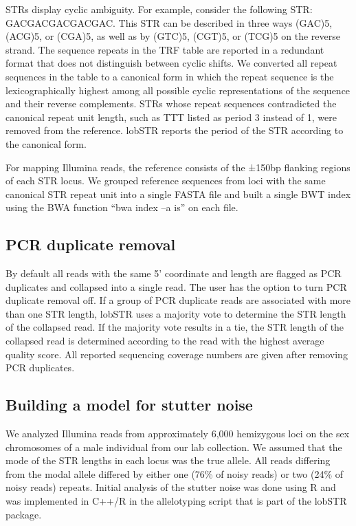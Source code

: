 STRs display cyclic ambiguity. For example, consider the following STR: GACGACGACGACGAC. This STR can be described in three ways (GAC)5, (ACG)5, or (CGA)5, as well as by (GTC)5, (CGT)5, or (TCG)5 on the reverse strand. The sequence repeats in the TRF table are reported in a redundant format that does not distinguish between cyclic shifts. We converted all repeat sequences in the table to a canonical form in which the repeat sequence is the lexicographically highest among all possible cyclic representations of the sequence and their reverse complements. STRs whose repeat sequences contradicted the canonical repeat unit length, such as TTT listed as period 3 instead of 1, were removed from the reference. lobSTR reports the period of the STR according to the canonical form.

For mapping Illumina reads, the reference consists of the ±150bp flanking regions of each STR locus. We grouped reference sequences from loci with the same canonical STR repeat unit into a single FASTA file and built a single BWT index using the BWA function ``bwa index –a is'' on each file.

\subsection{PCR duplicate removal}
By default all reads with the same 5' coordinate and length are flagged as PCR duplicates and collapsed into a single read. The user has the option to turn PCR duplicate removal off. If a group of PCR duplicate reads are associated with more than one STR length, lobSTR uses a majority vote to determine the STR length of the collapsed read. If the majority vote results in a tie, the STR length of the collapsed read is determined according to the read with the highest average quality score. All reported sequencing coverage numbers are given after removing PCR duplicates.

\subsection{Building a model for stutter noise}
We analyzed Illumina reads from approximately 6,000 hemizygous loci on the sex chromosomes of a male individual from our lab collection. We assumed that the mode of the STR lengths in each locus was the true allele. All reads differing from the modal allele differed by either one (76\% of noisy reads) or two (24\% of noisy reads) repeats. Initial analysis of the stutter noise was done using R and was implemented in C++/R in the allelotyping script that is part of the lobSTR package.

